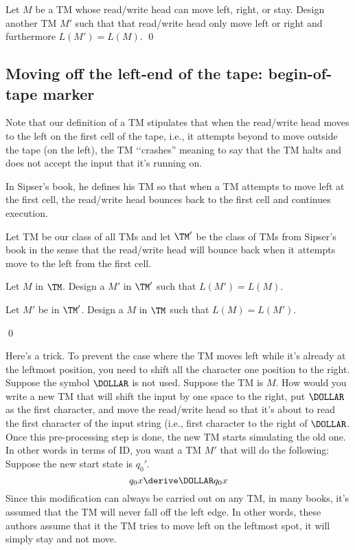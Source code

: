 \begin{ex}
Let $M$ be a TM whose read/write head can move left, right, or stay.
Design another TM $M'$ such that that read/write head only move left or right
and furthermore $L(M') = L(M)$.
\qed
\end{ex}

\newpage
\subsection{Moving off the left-end of the tape: begin-of-tape marker}

Note that our definition of a TM stipulates that when the read/write
head moves to the left on the first cell of the tape, i.e.,
it attempts beyond to move outside the tape (on the left),
the TM \lq\lq crashes'' meaning to say that
the TM halts and does not accept the input that it's running on.

In Sipser's book, he defines his TM so that
when a TM attempts to move left at the first cell, the read/write head
bounces back to the first cell and continues execution.

Let TM be our class of all TMs
and let $\TM'$ be the class of TMs from Sipser's book
in the sense that the read/write head will bounce back when it attempts
move to the left from the first cell.

\begin{ex}
  \begin{tightlist}
    \item Let $M$ in $\TM$. Design a $M'$ in $\TM'$ such that $L(M') = L(M)$.
    \item Let $M'$ be in $\TM'$.
    Design a $M$ in $\TM$ such that $L(M) = L(M')$.
  \end{tightlist}
  \qed
\end{ex}


\begin{eg} Here's a trick. To prevent the case where the TM moves
left while it's already at the leftmost position, you need to
shift all the character one position to the right.
Suppose the
symbol $\DOLLAR$ is not used. Suppose the TM is $M$. How would you
write a new TM that will shift the input by one space to the
right, put $\DOLLAR$ as the first character, and move the read/write
head so that it's about to read the first character of the input
string (i.e., first character to the right of $\DOLLAR$. Once this
pre-processing step is done, the new TM starts simulating the old
one. In other words in terms of ID, you want a TM $M'$ that will
do the following: Suppose the new start state is $q_0'$.
\[
 q_0x \derive \DOLLAR q_0x
\]
Since this modification can always be carried out on any TM, in
many books, it's assumed that the TM will never fall off the left
edge. In other words, these authors assume that it the TM tries to
move left on the leftmost spot, it will simply stay and not move.
\end{eg}


